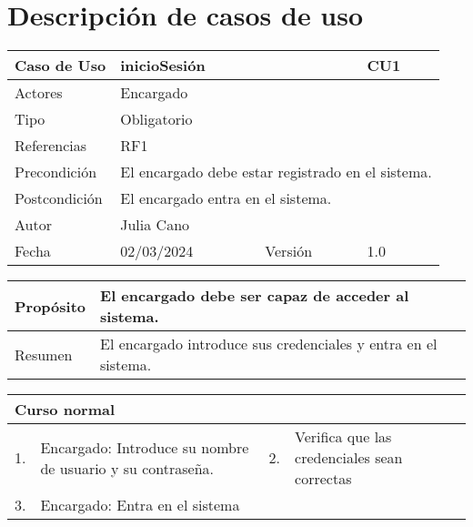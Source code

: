 \chapter{Descripción de casos de uso}
\label{chap:anexo1}



\begin{table}[H]
	\centering
	\begin{tabular}{| m{} | m{} | m{} | m{} |}
		\hline
		\rowcolor{grayshade} Caso de Uso & \multicolumn{2}{|m{0.43\textwidth}|}{inicioSesión} &  CU1\\ 
		\hline
		Actores & \multicolumn{3}{l|}{Encargado} \\ 
		\hline
		Tipo & \multicolumn{3}{l|}{Obligatorio} \\ 
		\hline
		Referencias & \multicolumn{3}{l|}{RF1} \\ 
		\hline
		Precondición & \multicolumn{3}{l|}{El encargado debe estar registrado en el sistema.} \\ 
		\hline
		Postcondición & \multicolumn{3}{l|}{El encargado entra en el sistema.} \\ 
		\hline
		Autor & \multicolumn{3}{l|}{Julia Cano} \\ 
		\hline
		Fecha & 02/03/2024 & Versión & 1.0 \\
		\hline
	\end{tabular}
\end{table}

\begin{table}[H]
	\centering
	\begin{tabular}{| m{} | m{} | m{} | m{} |}
		\hline
		Propósito & \multicolumn{3}{m{0.67\textwidth}|}{El encargado debe ser capaz de acceder al sistema.}   \\ 
		\hline
		Resumen & \multicolumn{3}{m{0.67\textwidth}|}{El encargado introduce sus credenciales y entra en el sistema.} \\ 
		\hline
	\end{tabular}
\end{table}

\begin{table}[H]
	\centering
	\begin{tabular}{| m{} | m{} | m{} | m{} |}
		\hline
		\multicolumn{4}{|m{0.9\textwidth}|}{Curso normal}     \\ 
		\hline
		1. & Encargado: Introduce su nombre de usuario y su contraseña. & 2. &  Verifica que las credenciales sean correctas \\ 
		\hline
		3. & Encargado: Entra en el sistema & &  \\ 
		\hline
	\end{tabular}
\end{table}

